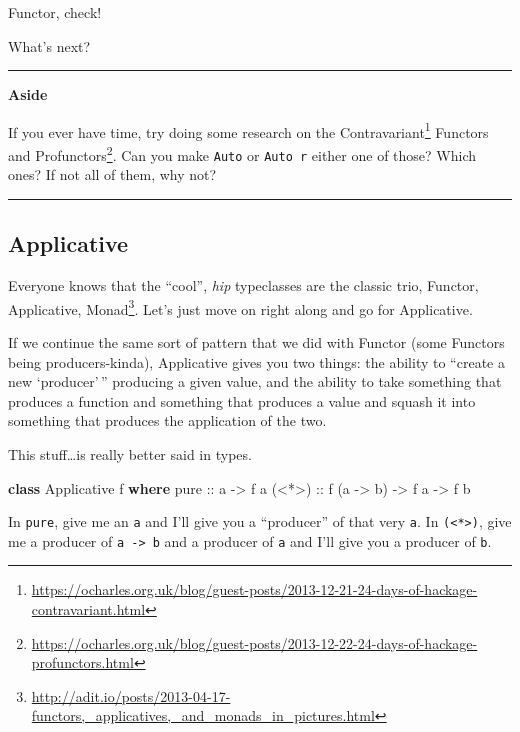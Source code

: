 \documentclass[]{article}
\newenvironment{Shaded}{}{}
\newcommand{\KeywordTok}[1]{\textcolor[rgb]{0.00,0.44,0.13}{\textbf{{#1}}}}
\newcommand{\DataTypeTok}[1]{\textcolor[rgb]{0.56,0.13,0.00}{{#1}}}
\newcommand{\OtherTok}[1]{\textcolor[rgb]{0.00,0.44,0.13}{{#1}}}
\newcommand{\NormalTok}[1]{{#1}}
\renewcommand{\href}[2]{#2\footnote{\url{#1}}}
\begin{document}
Functor, check!

What's next?

\begin{center}\rule{0.5\linewidth}{\linethickness}\end{center}

\textbf{Aside}

If you ever have time, try doing some research on the
\href{https://ocharles.org.uk/blog/guest-posts/2013-12-21-24-days-of-hackage-contravariant.html}{Contravariant}
Functors and
\href{https://ocharles.org.uk/blog/guest-posts/2013-12-22-24-days-of-hackage-profunctors.html}{Profunctors}.
Can you make \texttt{Auto} or \texttt{Auto\ r} either one of those?
Which ones? If not all of them, why not?

\begin{center}\rule{0.5\linewidth}{\linethickness}\end{center}

\subsection{Applicative}\label{applicative}

Everyone knows that the ``cool'', \emph{hip} typeclasses are the classic
trio,
\href{http://adit.io/posts/2013-04-17-functors,_applicatives,_and_monads_in_pictures.html}{Functor,
Applicative, Monad}. Let's just move on right along and go for
Applicative.

If we continue the same sort of pattern that we did with Functor (some
Functors being producers-kinda), Applicative gives you two things: the
ability to ``create a new `producer'\,'' producing a given value, and
the ability to take something that produces a function and something
that produces a value and squash it into something that produces the
application of the two.

This stuff\ldots{}is really better said in types.

\begin{Shaded}
\begin{Highlighting}[]
\KeywordTok{class} \DataTypeTok{Applicative} \NormalTok{f }\KeywordTok{where}
\OtherTok{    pure  ::} \NormalTok{a }\OtherTok{->} \NormalTok{f a}
\OtherTok{    (<*>) ::} \NormalTok{f (a }\OtherTok{->} \NormalTok{b) }\OtherTok{->} \NormalTok{f a }\OtherTok{->} \NormalTok{f b}
\end{Highlighting}
\end{Shaded}

In \texttt{pure}, give me an \texttt{a} and I'll give you a ``producer''
of that very \texttt{a}. In \texttt{(\textless{}*\textgreater{})}, give
me a producer of \texttt{a\ -\textgreater{}\ b} and a producer of
\texttt{a} and I'll give you a producer of \texttt{b}.
\end{document}
